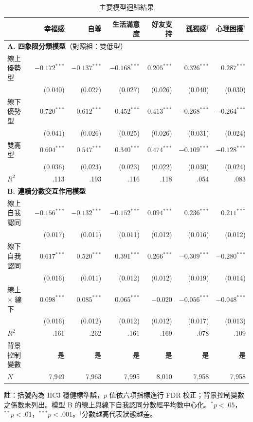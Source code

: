 \begin{table}[htbp]
\centering
\caption{主要模型迴歸結果}
\label{tab:reg}
\footnotesize
\setlength{\tabcolsep}{6pt}
\renewcommand{\arraystretch}{1.12}
\begin{tabular}{l rrrrrr}
\toprule
& 幸福感 & 自尊 & 生活滿意度 & 好友支持 & 孤獨感$^{\dagger}$ & 心理困擾$^{\dagger}$ \\
\midrule
\multicolumn{7}{l}{\textbf{A. 四象限分類模型}（對照組：雙低型）} \\
\quad 線上優勢型 & $-0.172^{***}$ & $-0.137^{***}$ & $-0.168^{***}$ & $0.205^{***}$ & $0.326^{***}$ & $0.287^{***}$ \\
 & (0.040) & (0.027) & (0.027) & (0.026) & (0.040) & (0.030) \\[1pt]
\quad 線下優勢型 & $0.720^{***}$ & $0.612^{***}$ & $0.452^{***}$ & $0.413^{***}$ & $-0.268^{***}$ & $-0.264^{***}$ \\
 & (0.041) & (0.026) & (0.025) & (0.026) & (0.031) & (0.024) \\[1pt]
\quad 雙高型 & $0.604^{***}$ & $0.547^{***}$ & $0.340^{***}$ & $0.474^{***}$ & $-0.109^{***}$ & $-0.128^{***}$ \\
 & (0.036) & (0.023) & (0.023) & (0.022) & (0.030) & (0.024) \\[1pt]
\quad $R^2$ & .113 & .193 & .116 & .118 & .054 & .083 \\
\midrule
\multicolumn{7}{l}{\textbf{B. 連續分數交互作用模型}} \\
\quad 線上自我認同 & $-0.156^{***}$ & $-0.132^{***}$ & $-0.152^{***}$ & $0.094^{***}$ & $0.236^{***}$ & $0.211^{***}$ \\
 & (0.017) & (0.011) & (0.011) & (0.012) & (0.016) & (0.012) \\[1pt]
\quad 線下自我認同 & $0.617^{***}$ & $0.520^{***}$ & $0.391^{***}$ & $0.266^{***}$ & $-0.309^{***}$ & $-0.280^{***}$ \\
 & (0.016) & (0.011) & (0.012) & (0.012) & (0.019) & (0.014) \\[1pt]
\quad 線上 $\times$ 線下 & $0.098^{***}$ & $0.085^{***}$ & $0.065^{***}$ & $-0.020$ & $-0.056^{***}$ & $-0.048^{***}$ \\
 & (0.016) & (0.012) & (0.012) & (0.012) & (0.017) & (0.013) \\[1pt]
\quad $R^2$ & .161 & .262 & .161 & .169 & .078 & .109 \\
\midrule
背景控制變數 & 是 & 是 & 是 & 是 & 是 & 是 \\
$N$ & 7,949 & 7,963 & 7,995 & 8,010 & 7,958 & 7,958 \\
\bottomrule
\end{tabular}

\vspace{0.4em}
\parbox{\linewidth}{\scriptsize 註：括號內為 HC3 穩健標準誤，$p$ 值依六項指標進行 FDR 校正；背景控制變數之係數未列出。模型 B 的線上與線下自我認同分數經平均數中心化。$^{*}p<.05$，$^{**}p<.01$，$^{***}p<.001$。$^{\dagger}$分數越高代表狀態越差。}
\end{table}
